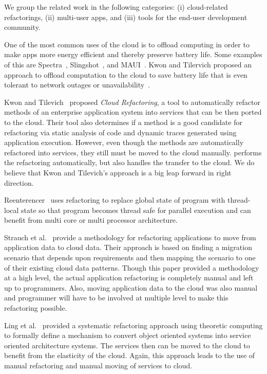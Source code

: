 \documentclass{sigplanconf}
\begin{document}
We group the related work in the following categories: (i) cloud-related refactorings, (ii) multi-user apps, and (iii) tools for the end-user development community.

One of the most common uses of the cloud is to offload computing in order to make apps more energy efficient and thereby preserve battery life.  Some examples of this are Spectra~\cite{flinn2002balancing}, Slingshot~\cite{su2005slingshot}, and MAUI~\cite{cuervo2010maui}. 
Kwon and Tilervich proposed an approach to offload computation to the cloud to save battery life that is even tolerant to network outages or 
unavailability~\cite{kwon2012energy}.

Kwon and Tilevich~\cite{kwon2013cloud} proposed \emph{Cloud Refactoring}, a tool to automatically refactor methods of an enterprise application system into services that can be then ported to the cloud. Their tool also determines if a method is a good candidate for refactoring via static analysis of code and dynamic traces generated using application execution. However, even though the methods are automatically refactored into services, they still must be moved to the cloud manually.  \tool performs the refactoring automatically, but also handles the transfer to the cloud.  We do believe that Kwon and Tilevich's approach is a big leap forward in right direction.  

Reenterencer~\cite{wloka2009refactoring} uses refactoring to replace global state of program with thread-local state so that program becomes thread safe for parallel execution and can benefit from multi core or multi processor architecture.

Strauch et al.~\cite{strauchmigrating} provide a methodology for refactoring applications to move from application data to cloud data.  Their approach is based on finding a migration scenario that depends upon requirements and then mapping the scenario to one of their existing cloud data patterns. Though this paper provided a methodology at a high level, the actual application refactoring is completely manual and left up to programmers. Also, moving application data to the cloud was also manual  and programmer will have to be involved at multiple level to make this refactoring possible.  

Ling et al.~\cite{ling2010refactoring} provided a systematic refactoring approach using theoretic computing to formally define a mechanism to convert object oriented systems into service oriented architecture systems. The services then can be moved to the cloud to benefit from the elasticity of the cloud. Again, this approach leads to the use of manual refactoring and manual moving of services to cloud. 
\end{document}
